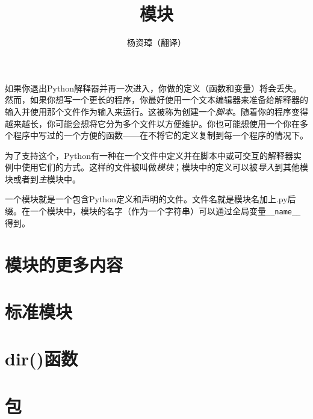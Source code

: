 \documentclass{ctexart}
\title{模块}
\author{杨资璋（翻译）}
\begin{document}
\maketitle
如果你退出Python解释器并再一次进入，你做的定义（函数和变量）将会丢失。然而，如果你想写一个更长的程序，你最好使用一个文本编辑器来准备给解释器的输入并使用那个文件作为输入来运行。这被称为创建一个\textit{脚本}。随着你的程序变得越来越长，你可能会想将它分为多个文件以方便维护。你也可能想使用一个你在多个程序中写过的一个方便的函数——在不将它的定义复制到每一个程序的情况下。

为了支持这个，Python有一种在一个文件中定义并在脚本中或可交互的解释器实例中使用它们的方式。这样的文件被叫做\textit{模块}；模块中的定义可以被\textit{导入}到其他模块或者到\textit{主}模块中。

一个模块就是一个包含Python定义和声明的文件。文件名就是模块名加上.py后缀。在一个模块中，模块的名字（作为一个字符串）可以通过全局变量\lstinline{__name__}得到。
\section{模块的更多内容}


\section{标准模块}

\section{dir()函数}

\section{包}

\end{document}
